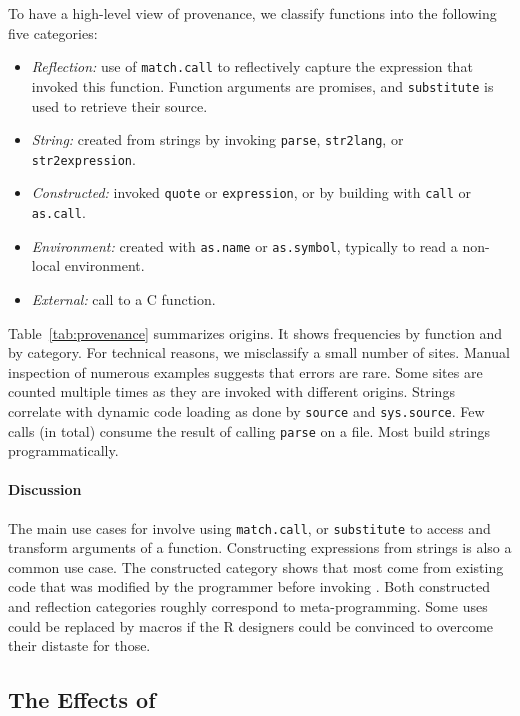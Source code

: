 \documentclass[acmsmall, screen]{acmart}
\renewcommand{\k}[1]{\lstinline |#1|\xspace}
\begin{document}
To have a high-level view of provenance, we classify functions into the
following five categories:

\begin{itemize}[---]
\item {\it Reflection:} use of \k{match.call} to reflectively capture the
  expression that invoked this function. Function arguments are promises, and
  \k{substitute} is used to retrieve their source.
\item {\it String:} created from strings by invoking \k{parse},
  \k{str2lang}, or \k{str2expression}.
\item {\it Constructed:} invoked \k{quote} or \k{expression}, or by building with
  \k{call} or \k{as.call}.
\item {\it Environment: } created with \k{as.name} or \k{as.symbol}, typically
  to read a non-local environment.
\item {\it External: }  call to a C function.
\end{itemize}

Table~\ref{tab:provenance} summarizes origins. It shows frequencies by function
and by category. For technical reasons, we misclassify a small number of sites.
Manual inspection of numerous examples suggests that errors are rare. Some sites
are counted multiple times as they are invoked with different origins. Strings
correlate with dynamic code loading as done by \k{source} and \k{sys.source}.
Few calls (\packageNbParseFromFileSites in total) consume the result of calling
\k{parse} on a file. Most build strings programmatically.


\paragraph{Discussion}
The main use cases for \eval involve using \k{match.call}, or \k{substitute} to
access and transform arguments of a function. Constructing expressions from
strings is also a common use case. The constructed category shows that most
\evals come from existing code that was modified by the programmer before
invoking \eval. Both constructed and reflection categories roughly correspond to
meta-programming. Some uses could be replaced by macros if the R designers could
be convinced to overcome their distaste for those.

\subsection{The Effects of \Eval}
\end{document}
